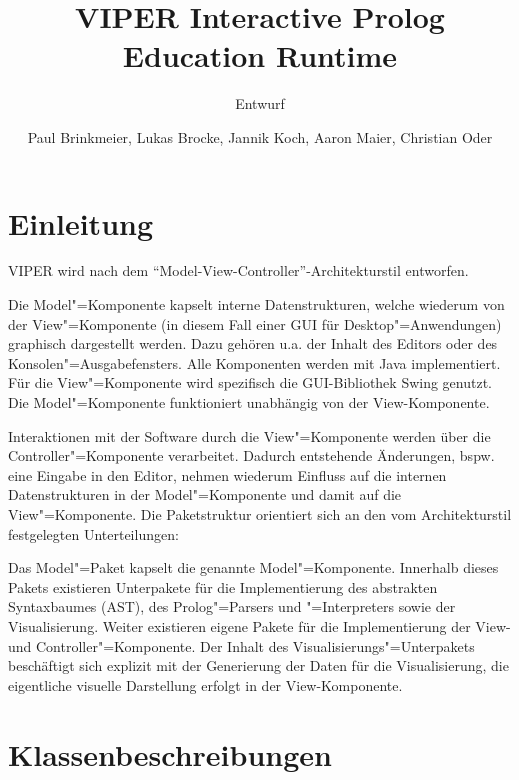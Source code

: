 \documentclass[parskip=full,11pt,twoside]{scrartcl}
\title{VIPER Interactive Prolog Education Runtime}
\subtitle{Entwurf}
\author{Paul Brinkmeier, Lukas Brocke, Jannik Koch, Aaron Maier, Christian Oder}
\begin{document}
\maketitle

\section{Einleitung}

VIPER wird nach dem \enquote{Model-View-Controller}-Architekturstil entworfen.

Die Model"=Komponente kapselt interne Datenstrukturen, welche wiederum von der View"=Komponente (in diesem Fall einer GUI für Desktop"=Anwendungen) graphisch dargestellt werden. Dazu gehören u.a. der Inhalt des Editors oder des Konsolen"=Ausgabefensters. Alle Komponenten werden mit Java implementiert. Für die View"=Komponente wird spezifisch die GUI-Bibliothek Swing genutzt. Die Model"=Komponente funktioniert unabhängig von der View-Komponente.

Interaktionen mit der Software durch die View"=Komponente werden über die Controller"=Komponente verarbeitet. Dadurch entstehende Änderungen, bspw. eine Eingabe in den Editor, nehmen wiederum Einfluss auf die internen Datenstrukturen in der Model"=Komponente und damit auf die View"=Komponente. Die Paketstruktur orientiert sich an den vom Architekturstil festgelegten Unterteilungen:\\

\begin{center}
	\begin{minipage}{0.4\textwidth}%
	\end{minipage}
\end{center}

Das Model"=Paket kapselt die genannte Model"=Komponente. Innerhalb dieses Pakets existieren Unterpakete für die Implementierung des abstrakten Syntaxbaumes (AST), des Prolog"=Parsers und "=Interpreters sowie der Visualisierung. Weiter existieren eigene Pakete für die Implementierung der View- und Controller"=Komponente. Der Inhalt des Visualisierungs"=Unterpakets beschäftigt sich explizit mit der Generierung der Daten für die Visualisierung, die eigentliche visuelle Darstellung erfolgt in der View-Komponente.


\section{Klassenbeschreibungen}
\end{document}
